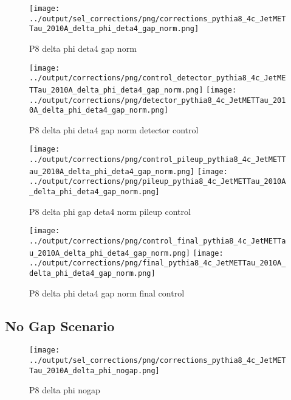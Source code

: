 \documentclass[11pt]{book}
\begin{document}
\begin{figure}[ht]
\centering
\texttt{[image: ../output/sel\_corrections/png/corrections\_pythia8\_4c\_JetMETTau\_2010A\_delta\_phi\_deta4\_gap\_norm.png]}
\caption{P8 delta phi deta4 gap norm}
\label{fig:p8_JetMETTau_2010A_delta_phi_deta4_gap_norm}
\end{figure}


\begin{figure}[ht]
\centering
\texttt{[image: ../output/corrections/png/control\_detector\_pythia8\_4c\_JetMETTau\_2010A\_delta\_phi\_deta4\_gap\_norm.png]}
\texttt{[image: ../output/corrections/png/detector\_pythia8\_4c\_JetMETTau\_2010A\_delta\_phi\_deta4\_gap\_norm.png]}
\caption{P8 delta phi deta4 gap norm detector control}
\label{fig:p8_JetMETTau_2010A_delta_phi_deta4_gap_norm_detector_control}
\end{figure}

\begin{figure}[ht]
\centering
\texttt{[image: ../output/corrections/png/control\_pileup\_pythia8\_4c\_JetMETTau\_2010A\_delta\_phi\_deta4\_gap\_norm.png]}
\texttt{[image: ../output/corrections/png/pileup\_pythia8\_4c\_JetMETTau\_2010A\_delta\_phi\_deta4\_gap\_norm.png]}
\caption{P8 delta phi gap deta4 norm pileup control}
\label{fig:p8_JetMETTau_2010A_delta_phi_deta4_gap_norm_pileup_control}
\end{figure}


\begin{figure}[ht]
\centering
\texttt{[image: ../output/corrections/png/control\_final\_pythia8\_4c\_JetMETTau\_2010A\_delta\_phi\_deta4\_gap\_norm.png]}
\texttt{[image: ../output/corrections/png/final\_pythia8\_4c\_JetMETTau\_2010A\_delta\_phi\_deta4\_gap\_norm.png]}
\caption{P8 delta phi deta4 gap norm final control}
\label{fig:p8_JetMETTau_2010A_delta_phi_deta4_gap_norm_final_control}
\end{figure}

\clearpage
\subsection{No Gap Scenario}
\begin{figure}[ht]
\centering
\texttt{[image: ../output/sel\_corrections/png/corrections\_pythia8\_4c\_JetMETTau\_2010A\_delta\_phi\_nogap.png]}
\caption{P8 delta phi nogap}
\label{fig:p8_JetMETTau_2010A_delta_phi_nogap}
\end{figure}
\end{document}
